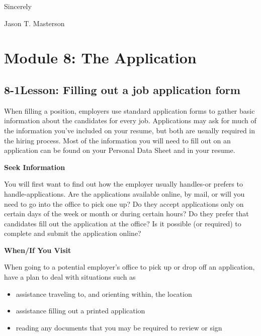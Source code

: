 Sincerely

Jason T. Masterson
  
\pagebreak \section*{Module 8: The Application}
\noindent\makebox[\textwidth]{\rule{\linewidth}{0.4pt}}  \localtableofcontents 
\noindent\makebox[\textwidth]{\rule{\linewidth}{0.4pt}} 


\pagebreak \subsection*{8-1\quad Lesson: Filling out a job application form}
When filling a position, employers use standard application forms to gather basic information about the candidates for every job. Applications may ask for much of the information you've included on your resume, but both are usually required in the hiring process. Most of the information you will need to fill out on an application can be found on your Personal Data Sheet and in your resume.

\textbf{Seek Information}

You will first want to find out how the employer usually handles-or prefers to handle-applications. Are the applications available online, by mail, or will you need to go into the office to pick one up? Do they accept applications only on certain days of the week or month or during certain hours? Do they prefer that candidates fill out the application at the office? Is it possible (or required) to complete and submit the application online?

\textbf{When/If You Visit}

When going to a potential employer's office to pick up or drop off an application, have a plan to deal with situations such as
\begin{itemize}[leftmargin=*]
\item assistance traveling to, and orienting within, the location
\item assistance filling out a printed application
\item reading any documents that you may be required to review or sign
\end{itemize}

